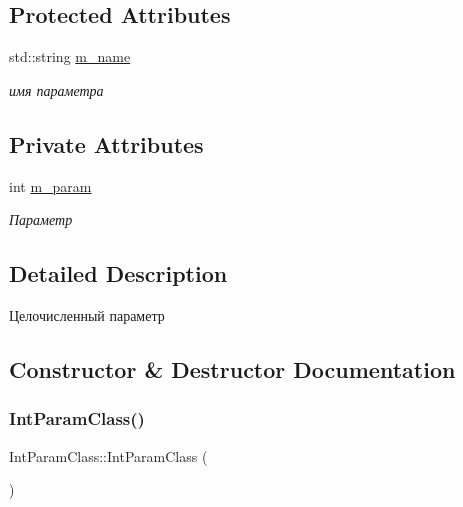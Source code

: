 \subsection*{Protected Attributes}
\begin{DoxyCompactItemize}
\item 
std\+::string \hyperlink{class_set_param_class_aab204889210304af482b414a6f8dbe82}{m\+\_\+name}
\begin{DoxyCompactList}\small\item\em имя параметра \end{DoxyCompactList}\end{DoxyCompactItemize}
\subsection*{Private Attributes}
\begin{DoxyCompactItemize}
\item 
int \hyperlink{class_int_param_class_a6c88503cfb7954435155ced60b4bf557}{m\+\_\+param}
\begin{DoxyCompactList}\small\item\em Параметр \end{DoxyCompactList}\end{DoxyCompactItemize}


\subsection{Detailed Description}
Целочисленный параметр 

\subsection{Constructor \& Destructor Documentation}
\mbox{\label{class_int_param_class_af146bb724848136903faed565cf03e79}} 
\subsubsection{\texorpdfstring{Int\+Param\+Class()}{IntParamClass()}\hspace{0.1cm}{\footnotesize\ttfamily [1/2]}}
{\footnotesize\ttfamily Int\+Param\+Class\+::\+Int\+Param\+Class (\begin{DoxyParamCaption}{ }\end{DoxyParamCaption})}

